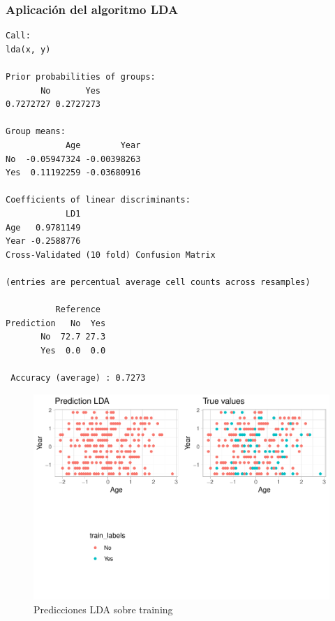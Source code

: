 \subsubsection{Aplicación del algoritmo LDA}

\begin{verbatim}
Call:
lda(x, y)

Prior probabilities of groups:
       No       Yes 
0.7272727 0.2727273 

Group means:
            Age        Year
No  -0.05947324 -0.00398263
Yes  0.11192259 -0.03680916

Coefficients of linear discriminants:
            LD1
Age   0.9781149
Year -0.2588776
Cross-Validated (10 fold) Confusion Matrix 

(entries are percentual average cell counts across resamples)
 
          Reference
Prediction   No  Yes
       No  72.7 27.3
       Yes  0.0  0.0
                            
 Accuracy (average) : 0.7273
\end{verbatim}

\begin{figure}[H]\center\includegraphics[width=.9\linewidth]{img/Clasificacion_files/figure-latex/unnamed-chunk-22-1}\caption{Predicciones LDA sobre training}\end{figure}

